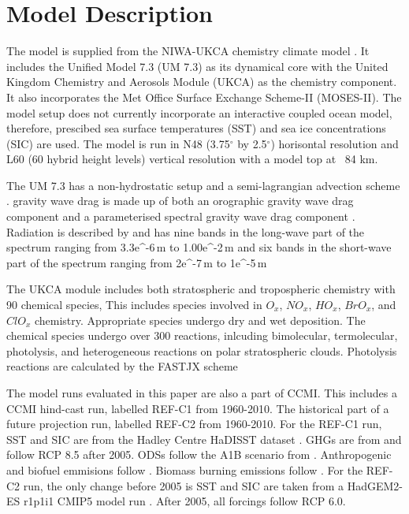 \section{Model Description}

The model is supplied from the NIWA-UKCA chemistry climate model \citep{Morgenstern:2009bu}. It includes the Unified Model 7.3 (UM 7.3) as its dynamical core with the United Kingdom Chemistry and Aerosols Module (UKCA) as the chemistry component. It also incorporates the Met Office Surface Exchange Scheme-II (MOSES-II). The model setup does not currently incorporate an interactive coupled ocean model, therefore, prescibed sea surface temperatures (SST) and sea ice concentrations (SIC) are used. The model is run in N48 (3.75$^\circ$ by 2.5$^\circ$) horisontal resolution and L60 (60 hybrid height levels) vertical resolution with a model top at ~84 km.

The UM 7.3 has a non-hydrostatic setup \citep{Davies:2005vu} and a semi-lagrangian advection scheme \citep{Priestley:1993ur}. gravity wave drag is made up of both an orographic gravity wave drag component \citep{Webster:2003vf} and a parameterised spectral gravity wave drag component \citep{Scaife:2002vt}. Radiation is described by \cite{Edwards:1996wo} and has nine bands in the long-wave part of the spectrum ranging from 3.3e^{-6}\,m to 1.00e^{-2}\,m and six bands in the short-wave part of the spectrum ranging from 2e^{-7}\,m to 1e^{-5}\,m

The UKCA module includes both stratospheric and tropospheric chemistry with 90 chemical species, This includes species involved in $O_x$, $NO_x$, $HO_x$, $BrO_x$, and $ClO_x$ chemistry. Appropriate species undergo dry and wet deposition. The chemical species undergo over 300 reactions, inlcuding bimolecular, termolecular, photolysis, and heterogeneous reactions on polar stratospheric clouds. Photolysis reactions are calculated by the FASTJX scheme \citep{Neu:2007wi}

The model runs evaluated in this paper are also a part of CCMI. This includes a CCMI hind-cast run, labelled REF-C1 from 1960-2010. The historical part of a future projection run, labelled REF-C2 from 1960-2010. For the REF-C1 run, SST and SIC are from the Hadley Centre HaDISST dataset \citep{Rayner:2003ty}. GHGs are from \citep{Meinshausen:2011is} \citep{Riahi:2011dk} and follow RCP 8.5 after 2005. ODSs follow the A1B scenario from \citep{WMO:2011vf}. Anthropogenic and biofuel emmisions follow \citep{Granier:2011dw}. Biomass burning emissions follow \citep{Lamarque:2011wr} \citep{vanderWerf:2006gi} \citep{Schultz:2008wf}. For the REF-C2 run, the only change before 2005 is SST and SIC are taken from a HadGEM2-ES r1p1i1 CMIP5 model run \cite{Jones:2011ii}. After 2005, all forcings follow RCP 6.0. 